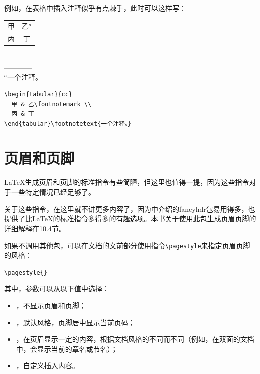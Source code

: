 例如，在表格中插入注释似乎有点棘手，此时可以这样写：

\begin{codelist}[2.19]{
  \begin{tabular}{cc}
    甲 & 乙$^a$ \\
    丙 & 丁\\
  \end{tabular}\\
  ————\\
  {\footnotesize $^a$一个注释。}
}\begin{verbatim}
\begin{tabular}{cc}
  甲 & 乙\footnotemark \\
  丙 & 丁
\end{tabular}\footnotetext{一个注释。}
\end{verbatim}
\end{codelist}

\section{页眉和页脚}

\LaTeX 生成页眉和页脚的标准指令有些简陋，但这里也值得一提，因为这些指令对于一些特定情况已经足够了。

\begin{ii}
关于这些指令，在这里就不讲更多内容了，因为中介绍的fancyhdr包易用得多，也提供了比\LaTeX 的标准指令多得多的有趣选项。本书关于使用此包生成页眉页脚的详细解释在10.4节。
\end{ii}

如果不调用其他包，可以在文档的文前部分使用指令\verb|\pagestyle|来指定页眉页脚的风格：

\begin{dmd}
\verb|\pagestyle{|\verb|}|
\end{dmd}

其中，参数可以从以下值中选择：

\begin{itemize}
  \item {}，不显示页眉和页脚；
  \item {}，默认风格，页脚居中显示当前页码；
  \item {}，在页眉显示一定的内容，根据文档风格的不同而不同（例如，在双面的文档中，会显示当前的章名或节名）；
  \item {}，自定义插入内容。
\end{itemize}

